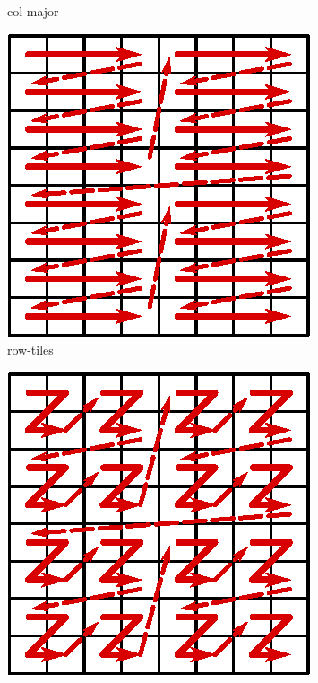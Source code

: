 \begin{figure}
\begin{subfigure}{.19\textwidth}
    \caption{col-major}
    \label{fig:layout-col}
\end{subfigure}
\begin{subfigure}{.19\textwidth}
    \centering
    \includegraphics[width=.9\linewidth]{figures/matrix-tiled}
    \caption{row-tiles}
    \label{fig:layout-tile}
\end{subfigure}
\begin{subfigure}{.19\textwidth}
    \centering
    \includegraphics[width=.9\linewidth]{figures/matrix-zcurve}

\end{subfigure}
\end{figure}
